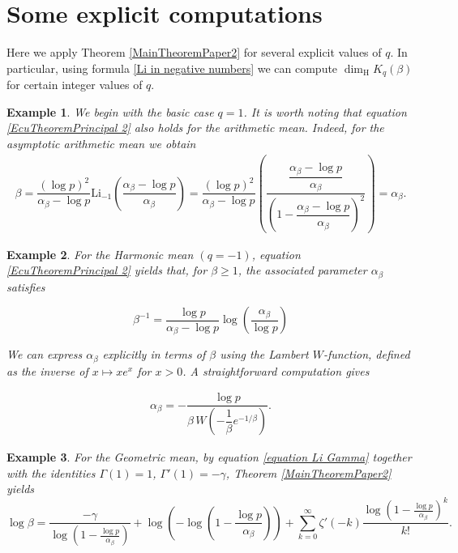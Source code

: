 \documentclass[11pt]{amsart}
\newtheorem{example}{Example}
\theoremstyle{remark}
\numberwithin{equation}{section}
\newcommand{\Li}{\mathrm{Li}}
\begin{document}
\section{Some explicit computations}
Here we apply Theorem \ref{MainTheoremPaper2} for several explicit values of $q$. In particular, using formula \eqref{Li in negative numbers} we can compute $\dim_\mathrm{H}K_{q}(\beta)$ for certain integer values of $q$.


\begin{example}
    We begin with the basic case $q=1$. It is worth noting that equation \eqref{EcuTheoremPrincipal 2} also holds for the arithmetic mean. Indeed, for the asymptotic arithmetic mean we obtain
    \begin{align*}
        \beta=\dfrac{(\log p)^{2}}{\alpha_{\beta}-\log p}\Li_{-1}\left(\dfrac{\alpha_{\beta}-\log p}{\alpha_{\beta}}\right)=\dfrac{(\log p)^{2}}{\alpha_{\beta}-\log p}\left(\dfrac{\dfrac{\alpha_{\beta}-\log p}{\alpha_{\beta}}}{\left(1-\dfrac{\alpha_{\beta}-\log p}{\alpha_{\beta}}\right)^{2}}\right)=\alpha_{\beta}.
    \end{align*}
\end{example}


\begin{example}
    For the Harmonic mean $(q=-1)$, equation \eqref{EcuTheoremPrincipal 2} yields that, for $\beta\geq1$, the associated parameter $\alpha_{\beta}$ satisfies

\[\beta^{-1}=\dfrac{\log p}{\alpha_\beta-\log p}\log \left(\dfrac{\alpha_\beta}{\log p} \right)\]

We can express $\alpha_\beta$ explicitly in terms of  $\beta$ using the Lambert $W$-function, defined as the inverse of $x\mapsto xe^x$ for $x>0$. A straightforward computation gives

    \begin{align*}
        \alpha_\beta=-\dfrac{\log p}{\beta \, W\left( -\dfrac{1}{\beta}e^{-1/\beta}\right)}.
    \end{align*}
\end{example}
\begin{example}
    For the Geometric mean, by equation \eqref{equation Li Gamma} together with the identities $\Gamma(1)=1$, $\Gamma'(1)=-\gamma$, Theorem \ref{MainTheoremPaper2} yields
    \[ \log \beta=\dfrac{-\gamma}{\log \left(1-\frac{\log p}{\alpha_\beta} \right)}+\log \left( -\log \left(1-\frac{\log p}{\alpha_\beta} \right)\right)+\sum_{k=0}^{\infty} \zeta'(-k)\dfrac{\log\left(1-\frac{\log p}{\alpha_\beta} \right)^k}{k!}.\]
\end{example}
   
\end{document}
